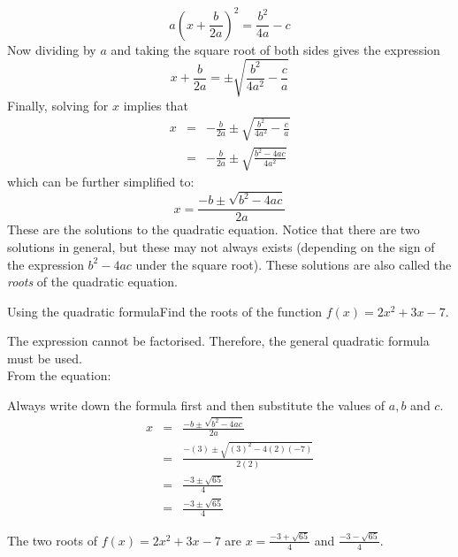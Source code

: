 \begin{equation}
a\left(x + \frac{b}{2a}\right)^{2} = \frac{b^{2}}{4a} - c
\end{equation}
Now dividing by $a$ and taking the square root of both sides gives the
expression
\begin{equation}
x + \frac{b}{2a} = \pm\sqrt{\frac{b^{2}}{4a^{2}} - \frac{c}{a}}
\end{equation}
Finally, solving for $x$ implies that
\begin{eqnarray*}
x& =& -\frac{b}{2a} \pm\sqrt{\frac{b^{2}}{4a^{2}} - \frac{c}{a}}\\
&=& -\frac{b}{2a} \pm \sqrt{\frac{b^{2} - 4ac}{4a^{2}}}
\end{eqnarray*}
which can be further simplified to:
\begin{equation}
x = \frac{-b \pm \sqrt{b^{2} - 4ac}}{2a}
\label{eq:qform}
\end{equation}
These are the solutions to the quadratic equation. Notice that there are two
solutions in general, but these may not always exists (depending on the sign of
the expression $b^{2} - 4ac$ under the square root). These solutions are also
called the \textit{roots} of the quadratic equation.

\begin{wex}{Using the quadratic formula}{Find the roots of the function $f(x) = 2x^{2} + 3x - 7$.\\}{
The expression cannot be factorised. Therefore, the general quadratic formula must be used.\\

From the equation:

Always write down the formula first and then substitute the values of $a, b$ and $c$.
\begin{eqnarray}
x & =& \frac{-b \pm \sqrt{b^{2} - 4ac}}{2a} \\
& =& \frac{-(3) \pm \sqrt{(3)^{2} -4(2)(-7)}}{2(2)} \\
& =& \frac{-3 \pm \sqrt{65}}{4} \\
& =& \frac{-3 \pm \sqrt{65}}{4}
\end{eqnarray}

The two roots of $f(x) = 2x^{2} + 3x - 7$ are $x = \frac{-3 + \sqrt{65}}{4}$ and $\frac{-3 - \sqrt{65}}{4}$.}
\end{wex}

